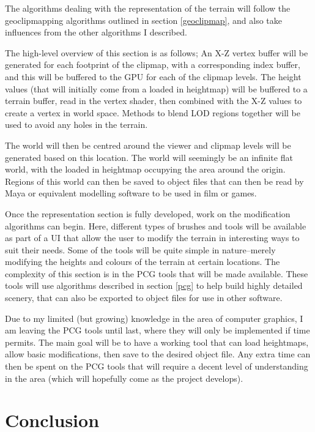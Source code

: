 \documentclass[notitlepage,12pt]{article}
\begin{document}
The algorithms dealing with the representation of the terrain will follow the geoclipmapping algorithms outlined in section \ref{geoclipmap}, and also take influences from the other algorithms I described. 

The high-level overview of this section is as follows; An X-Z vertex buffer will be generated for each footprint of the clipmap, with a corresponding index buffer, and this will be buffered to the GPU for each of the clipmap levels. The height values (that will initially come from a loaded in heightmap) will be buffered to a terrain buffer, read in the vertex shader, then combined with the X-Z values to create a vertex in world space. Methods to blend LOD regions together will be used to avoid any holes in the terrain.

The world will then be centred around the viewer and clipmap levels will be generated based on this location. The world will seemingly be an infinite flat world, with the loaded in heightmap occupying the area around the origin. Regions of this world can then be saved to object files that can then be read by Maya or equivalent modelling software to be used in film or games.

Once the representation section is fully developed, work on the modification algorithms can begin. Here, different types of brushes and tools will be available as part of a UI that allow the user to modify the terrain in interesting ways to suit their needs. Some of the tools will be quite simple in nature--merely modifying the heights and colours of the terrain at certain locations. The complexity of this section is in the PCG tools that will be made available. These tools will use algorithms described in section \ref{pcg} to help build highly detailed scenery, that can also be exported to object files for use in other software.

Due to my limited (but growing) knowledge in the area of computer graphics, I am leaving the PCG tools until last, where they will only be implemented if time permits. The main goal will be to have a working tool that can load heightmaps, allow basic modifications, then save to the desired object file. Any extra time can then be spent on the PCG tools that will require a decent level of understanding in the area (which will hopefully come as the project develops).

\section{Conclusion}
\end{document}

